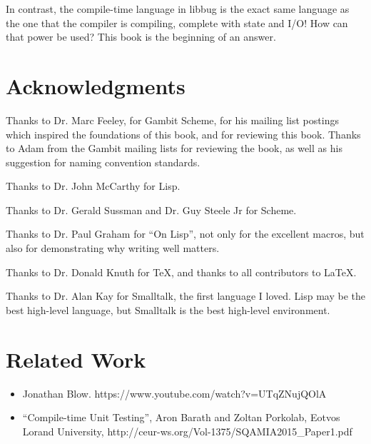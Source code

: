  In contrast, the compile-time
 language in libbug is the exact same language as the one that the compiler
 is compiling, complete with state and I/O!  How can that power be used?
 This book is the beginning of an answer.

\chapter{Acknowledgments}

Thanks to Dr. Marc Feeley, for Gambit Scheme, for his mailing list postings
which inspired the foundations of this book, and for reviewing this
book.  Thanks to Adam from the Gambit mailing lists for reviewing the book,
as well as his suggestion for naming convention standards.

Thanks to Dr. John McCarthy for Lisp.

Thanks to Dr. Gerald Sussman and Dr. Guy Steele Jr for Scheme.

Thanks to Dr. Paul Graham for ``On Lisp'', not only for the excellent macros,
but also for demonstrating why writing well matters.

Thanks to Dr. Donald Knuth for \TeX, and thanks to all contributors to
\LaTeX.

Thanks to Dr. Alan Kay for Smalltalk, the first language I loved.  Lisp may be the best high-level language, but Smalltalk is the best high-level environment.

\chapter{Related Work}
\begin{itemize}
        \item  Jonathan Blow. https://www.youtube.com/watch?v=UTqZNujQOlA
        \item  ``Compile-time Unit Testing'',
           Aron Barath and Zoltan Porkolab, Eotvos Lorand University, \newline
           http://ceur-ws.org/Vol-1375/SQAMIA2015\_Paper1.pdf
\end{itemize}

